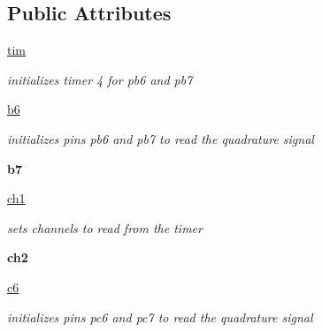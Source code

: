 \subsection*{Public Attributes}
\begin{DoxyCompactItemize}
\item 
\mbox{\hyperlink{classencoder_1_1_encoder_a6d34277d78f0f528aeb8b4d8901356b7}{tim}}
\begin{DoxyCompactList}\small\item\em initializes timer 4 for pb6 and pb7 \end{DoxyCompactList}\item 
\mbox{\label{classencoder_1_1_encoder_af5b110516a9ea8add87aa96427efe281}} 
\mbox{\hyperlink{classencoder_1_1_encoder_af5b110516a9ea8add87aa96427efe281}{b6}}
\begin{DoxyCompactList}\small\item\em initializes pins pb6 and pb7 to read the quadrature signal \end{DoxyCompactList}\item 
\mbox{\label{classencoder_1_1_encoder_a444cc2bb2eec080f518316579c93befb}} 
{\bfseries b7}
\item 
\mbox{\label{classencoder_1_1_encoder_a076f2be10f58f336dd7fb70b55feee6f}} 
\mbox{\hyperlink{classencoder_1_1_encoder_a076f2be10f58f336dd7fb70b55feee6f}{ch1}}
\begin{DoxyCompactList}\small\item\em sets channels to read from the timer \end{DoxyCompactList}\item 
\mbox{\label{classencoder_1_1_encoder_a1c05e07f7131cc3d173daf4d26b605b5}} 
{\bfseries ch2}
\item 
\mbox{\label{classencoder_1_1_encoder_a9bb5f42fb22b53704077222cd7600887}} 
\mbox{\hyperlink{classencoder_1_1_encoder_a9bb5f42fb22b53704077222cd7600887}{c6}}
\begin{DoxyCompactList}\small\item\em initializes pins pc6 and pc7 to read the quadrature signal \end{DoxyCompactList}\item 
\mbox{\label{classencoder_1_1_encoder_aa3e442f59b8c9691ea25078b177fea72}} 

\end{DoxyCompactItemize}

